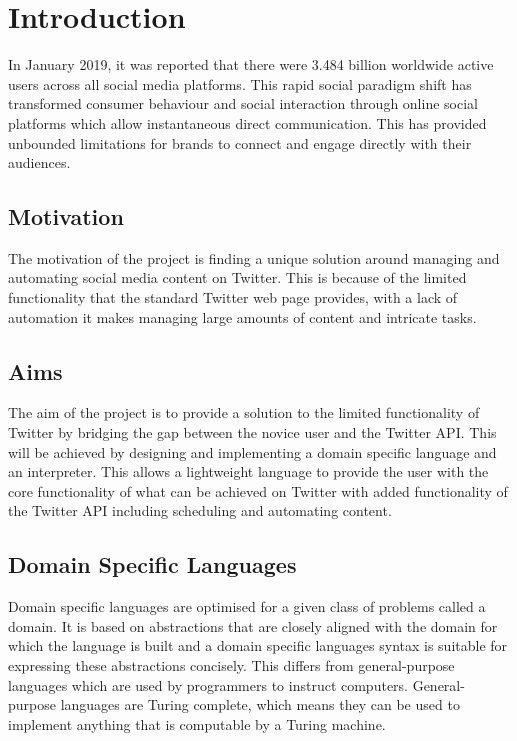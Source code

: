 \renewcommand{\chaptername}{}

\chapter{Introduction}

In January 2019, it was reported that there were 3.484 billion worldwide active users across all social media platforms. This rapid social paradigm shift has transformed consumer behaviour and social interaction through online social platforms which allow instantaneous direct communication. This has provided unbounded limitations for brands to connect and engage directly with their audiences.

\section{Motivation}

The motivation of the project is finding a unique solution around managing and automating social media content on Twitter. This is because of the limited functionality that the standard Twitter web page provides, with a lack of automation it makes managing large amounts of content and intricate tasks.

\section{Aims}

The aim of the project is to provide a solution to the limited functionality of Twitter by bridging the gap between the novice user and the Twitter API. This will be achieved by designing and implementing a domain specific language and an interpreter. This allows a lightweight language to provide the user with the core functionality of what can be achieved on Twitter with added functionality of the Twitter API including scheduling and automating content.

\section{Domain Specific Languages}

Domain specific languages are optimised for a given class of problems called a domain.  It is based on abstractions that are closely aligned with the domain for which the language is built and a domain specific languages syntax is suitable for expressing these abstractions concisely. This differs from general-purpose languages which are used by programmers to instruct computers. General-purpose languages are Turing complete, which means they can be used to implement anything that is computable by a Turing machine. \\

